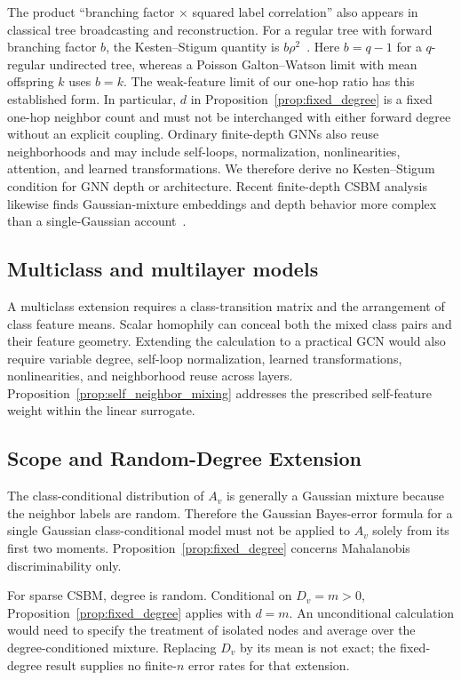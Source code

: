 The product ``branching factor $\times$ squared label correlation'' also appears in classical tree broadcasting and reconstruction. For a regular tree with forward branching factor $b$, the Kesten--Stigum quantity is $b\rho^2$~\citep{kesten1966additional,mossel2015reconstruction}. Here $b=q-1$ for a $q$-regular undirected tree, whereas a Poisson Galton--Watson limit with mean offspring $k$ uses $b=k$. The weak-feature limit of our one-hop ratio has this established form. In particular, $d$ in Proposition~\ref{prop:fixed_degree} is a fixed one-hop neighbor count and must not be interchanged with either forward degree without an explicit coupling. Ordinary finite-depth GNNs also reuse neighborhoods and may include self-loops, normalization, nonlinearities, attention, and learned transformations. We therefore derive no Kesten--Stigum condition for GNN depth or architecture. Recent finite-depth CSBM analysis likewise finds Gaussian-mixture embeddings and depth behavior more complex than a single-Gaussian account~\citep{pmlr-v269-dalle25a}.

\subsection{Multiclass and multilayer models}

A multiclass extension requires a class-transition matrix and the arrangement of class feature means. Scalar homophily can conceal both the mixed class pairs and their feature geometry. Extending the calculation to a practical GCN would also require variable degree, self-loop normalization, learned transformations, nonlinearities, and neighborhood reuse across layers. Proposition~\ref{prop:self_neighbor_mixing} addresses the prescribed self-feature weight within the linear surrogate.

\subsection{Scope and Random-Degree Extension}

The class-conditional distribution of $A_v$ is generally a Gaussian mixture because the neighbor labels are random. Therefore the Gaussian Bayes-error formula for a single Gaussian class-conditional model must not be applied to $A_v$ solely from its first two moments. Proposition~\ref{prop:fixed_degree} concerns Mahalanobis discriminability only.

For sparse CSBM, degree is random. Conditional on $D_v=m>0$, Proposition~\ref{prop:fixed_degree} applies with $d=m$. An unconditional calculation would need to specify the treatment of isolated nodes and average over the degree-conditioned mixture. Replacing $D_v$ by its mean is not exact; the fixed-degree result supplies no finite-$n$ error rates for that extension.
